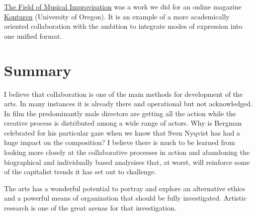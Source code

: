 \documentclass[a4paper,hidelinks]{article}
\begin{document}
\href{http://musicalimprovisation.free.fr/index.php}{The Field of Musical Improvisation} was a work we did for an online magazine \href{http://konturen.uoregon.edu/}{Konturen} (University of Oregon). It is an example of a more academically oriented collaboration with the ambition to integrate modes of expression into one unified format.

\section{Summary}

I believe that collaboration is one of the main methods for development of the arts. In many instances it is already there and operational but not acknowledged. In film the predominantly male directors are getting all the action while the creative process is distributed among a wide range of actors. Why is Bergman celebrated for his particular gaze when we know that Sven Nyqvist has had a huge impact on the composition? I believe there is much to be learned from looking more closely at the collaborative processes in action and abandoning the biographical and individually based analysises that, at worst, will reinforce some of the capitalist trends it has set out to challenge.

The arts has a wonderful potential to portray and explore an alternative ethics and a powerful means of organization that should be fully investigated. Artistic research is one of the great arenas for that investigation.

 
\end{document}

